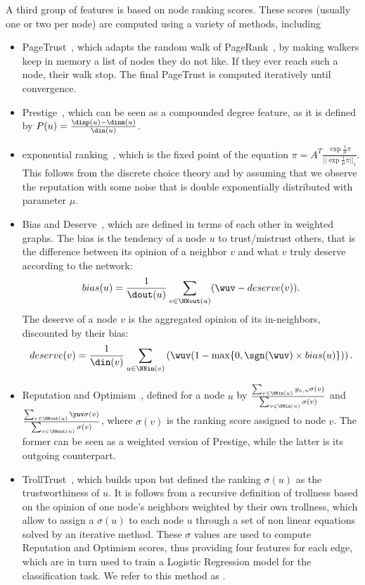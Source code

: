 A third group of features is based on node ranking scores. These scores (usually one or two per
node) are computed using a variety of methods, including
\begin{itemize}
	\item	PageTrust~\autocite{de2008pagetrust}, which adapts the random walk of
		PageRank~\autocite{pagerank99}, by making walkers keep in memory a list of nodes they do not
		like. If they ever reach such a node, their walk stop. The final PageTrust is computed
		iteratively until convergence. 
	\item Prestige~\autocite{zolfaghar2010mining}, which can be seen as a compounded degree feature,
		as it is defined by $P(u) = \frac{\dinp(u)-\dinm(u)}{\din(u)}$.
	\item	exponential ranking~\autocite{traag2010exponential}, which is the fixed point of the
		equation $\pi = A^T\frac{\exp{\frac{1}{\mu}\pi}}{||\exp{\frac{1}{\mu}\pi}||_1}$. This follows
		from the discrete choice theory and by assuming that we observe the reputation with some noise
		that is double exponentially distributed with parameter $\mu$.
	\item	Bias and Deserve~\autocite{mishra2011finding}, which are defined in terms of each other in
		weighted graphs. The bias is the tendency of a node $u$ to trust/mistrust others, that is the
		difference between its opinion of a neighbor $v$ and what $v$ truly deserve according to the
		network: \[bias(u) = \frac{1}{\dout(u)}\sum_{v\in\NNout(u)}(\wuv - deserve(v)).\] The deserve of a
		node $v$ is the aggregated opinion of its in-neighbors, discounted by their bias: \[deserve(v) =
		\frac{1}{\din(v)}\sum_{u\in\NNin(v)}\left(\wuv(1-\max\{0, \sgn(\wuv)\times bias(u)\})\right).\]
	\item	Reputation and Optimism~\autocite{shahriari2014ranking}, defined for a node $u$ by
		$\frac{\sum_{v \in \NNin(u)} y_{v,u}\sigma(v)}{\sum_{v \in \NNin(u)} \sigma(v)}$ and $
		\frac{\sum_{v \in \NNout(u)} \yuv\sigma(v)}{\sum_{v \in \NNout(u)} \sigma(v)}$, where
		$\sigma(v)$ is the ranking score assigned to node $v$. The former can be seen as a weighted
		version of Prestige, while the latter is its outgoing counterpart.
	\item	TrollTrust~\autocite{wu2016troll}, which builds upon \autocite{shahriari2014ranking} but
		defined the ranking $\sigma(u)$ as the trustworthiness of $u$. It is follows from a recursive
		definition of trollness based on the opinion of one node's neighbors weighted by their own
		trollness, which allow to assign a $\sigma(u)$ to each node $u$ through a set of non linear
		equations solved by an iterative method. These $\sigma$ values are used to compute Reputation
		and Optimism scores, thus providing four features for each edge, which are in turn used to train
		a Logistic Regression model for the classification task. We refer to this method as
		\emph{\compranknodes{}}.
\end{itemize}

